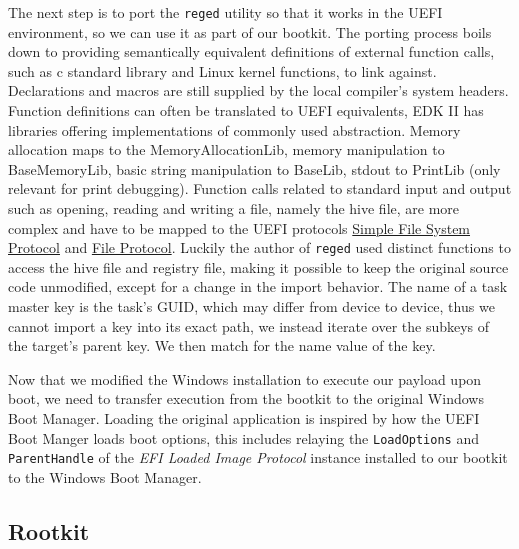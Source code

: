 The next step is to port the \lstinline{reged} utility so that it works in the UEFI environment, so we can use it as part of our bootkit.
The porting process boils down to providing semantically equivalent definitions of external function calls, such as c standard library and Linux kernel functions, to link against.
Declarations and macros are still supplied by the local compiler's system headers.
Function definitions can often be translated to \ac{UEFI} equivalents, \ac{EDK} II has libraries offering implementations of commonly used abstraction.
Memory allocation maps to the MemoryAllocationLib, memory manipulation to BaseMemoryLib, basic string manipulation to BaseLib, stdout to PrintLib (only relevant for print debugging).
Function calls related to standard input and output such as opening, reading and writing a file, namely the hive file, are more complex and have to be mapped to the \ac{UEFI} protocols \hyperref[lst:simple-file-system-protocol]{Simple File System Protocol} and \hyperref[lst:simple-file-system-protocol]{File Protocol}.
Luckily the author of \lstinline{reged} used distinct functions to access the hive file and registry file, making it possible to keep the original source code unmodified, except for a change in the import behavior.
The name of a task master key is the task's \ac{GUID}, which may differ from device to device, thus we cannot import a key into its exact path, we instead iterate over the subkeys of the target's parent key.
We then match for the name value of the key.

Now that we modified the Windows installation to execute our payload upon boot, we need to transfer execution from the bootkit to the original Windows Boot Manager.
Loading the original application is inspired by how the UEFI Boot Manger loads boot options, this includes relaying the \lstinline{LoadOptions} and \lstinline{ParentHandle} of the \emph{\ac{EFI} Loaded Image Protocol}\cite[9.1]{uefi-spec} instance installed to our bootkit to the Windows Boot Manager.


\subsection{Rootkit}

